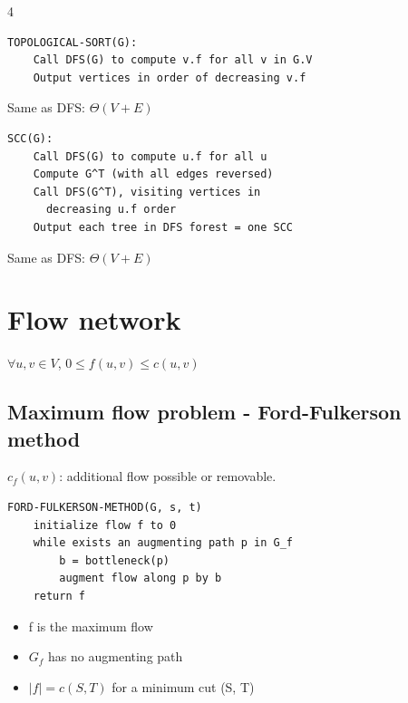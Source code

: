 \documentclass[8pt,a4paper,landscape]{extarticle}
\begin{document}
\begin{multicols*}{4}
\begin{lstlisting}
TOPOLOGICAL-SORT(G):
    Call DFS(G) to compute v.f for all v in G.V
    Output vertices in order of decreasing v.f
\end{lstlisting}

\begin{prop}[title=Runtime]
Same as DFS: $\Theta(V+E)$
\end{prop}

\begin{lstlisting}
SCC(G):
    Call DFS(G) to compute u.f for all u
    Compute G^T (with all edges reversed)
    Call DFS(G^T), visiting vertices in
      decreasing u.f order
    Output each tree in DFS forest = one SCC
\end{lstlisting}

\begin{prop}[title=Runtime]
Same as DFS: $\Theta(V+E)$
\end{prop}

\section{Flow network}

\begin{thm}[title=Capacity constraint]
$\forall u,v\in V$, $0\le f(u,v)\le c(u,v)$
\end{thm}

\subsection{Maximum flow problem - Ford-Fulkerson method}

\begin{prop}[title={Residual network $G_f=(V,E_f)$}]
$c_f(u,v)$: additional flow possible or removable.
\end{prop}

\begin{lstlisting}
FORD-FULKERSON-METHOD(G, s, t)
    initialize flow f to 0
    while exists an augmenting path p in G_f
        b = bottleneck(p)
        augment flow along p by b
    return f
\end{lstlisting}

\begin{thm}[title=Max-flow min-cut theorem ($\Leftrightarrow$)]
\begin{itemize}
  \item f is the maximum flow
  \item $G_f$ has no augmenting path
  \item $|f| = c(S,T)$ for a minimum cut (S, T)
\end{itemize}
\end{thm}


\end{multicols*}
\end{document}
